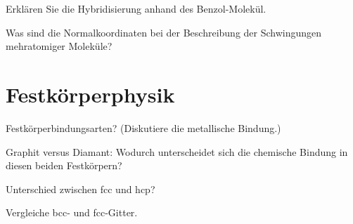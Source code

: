 \documentclass[a5paper,12pt,ngerman,print,grid=front]{kartei}
\begin{document}
	\begin{karte}{
		Erklären Sie die Hybridisierung anhand des Benzol-Molekül.
		}
		
		
		
	\end{karte}


	\begin{karte}{
		Was sind die Normalkoordinaten bei der Beschreibung der Schwingungen mehratomiger Moleküle?
		}
		
		
		
	\end{karte}




\section*{Festkörperphysik}



	\begin{karte}{
		Festkörperbindungsarten? (Diskutiere die metallische Bindung.)
		}
		
		
		
	\end{karte}


	\begin{karte}{
		Graphit versus Diamant: Wodurch unterscheidet sich die chemische Bindung in diesen
		beiden Festkörpern?
		}
		
		
		
	\end{karte}


	\begin{karte}{
		Unterschied zwischen fcc und hcp?
		}
		
		
		
	\end{karte}


	\begin{karte}{
		Vergleiche bcc- und fcc-Gitter.
		}
		
		
		
	\end{karte}
\end{document}
